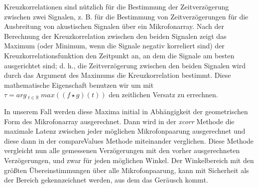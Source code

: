 Kreuzkorrelationen sind nützlich für die Bestimmung der Zeitverzögerung zwischen zwei Signalen, z. B. für die Bestimmung von Zeitverzögerungen für die Ausbreitung von akustischen Signalen über ein Mikrofonarray. Nach der Berechnung der Kreuzkorrelation zwischen den beiden Signalen zeigt das Maximum (oder Minimum, wenn die Signale negativ korreliert sind) der Kreuzkorrelationsfunktion den Zeitpunkt an, an dem die Signale am besten ausgerichtet sind; d. h., die Zeitverzögerung zwischen den beiden Signalen wird durch das Argument des Maximums die Kreuzkorrelation bestimmt. Diese mathematische Eigenschaft benutzen wir um mit
$ \tau= arg\ _{t \in \mathbb{R}}\ max\left(( f \star g)(t)\right) $ den zeitlichen Versatz zu errechnen.

In unserem Fall werden diese Maxima initial in Abhängigkeit der geometrischen Form des Mikrofonarray ausgerechnet. Dann wird in der \textit{xcorr} Methode die maximale Latenz zwischen jeder möglichen Mikrofonpaarung ausgerechnet und diese dann in der compareValues Methode miteinander verglichen. Diese Methode vergleicht nun alle gemessenen Verzögerungen mit den vorher ausgerechneten Verzögerungen, und zwar für jeden möglichen Winkel. Der Winkelbereich mit den größten Übereinstimmungen über alle Mikrofonpaarung, kann mit Sicherheit als der Bereich gekennzeichnet werden, aus dem das Geräusch kommt.

\newpage

